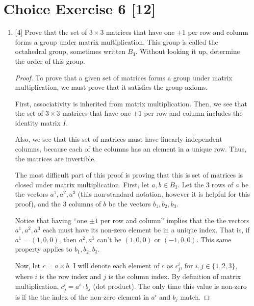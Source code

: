 \documentclass{article}
\begin{document}
\pagebreak

\section*{Choice Exercise 6 [12]}
\begin{enumerate}
    \item {
    [4]
        Prove that the set of \(3 \times 3\) matrices that have one \(\pm 1\) per row and column forms a group under matrix multiplication. This group is called the octahedral group, sometimes written \(B_3\). Without looking it up, determine the order of this group.

        \begin{proof}
            To prove that a given set of matrices forms a group under matrix multiplication,
            we must prove that it satisfies the group axioms. 

            First, associativity is inherited from matrix multiplication.
            Then, we see that the set of \(3 \times 3\) matrices that have one 
            \(\pm 1\) per row and column includes the identity matrix \(I\). 

            Also, we see that this set of matrices must have linearly independent 
            columns, because each of the columns has an element in a unique row. 
            Thus, the matrices are invertible. 

            The most difficult part of this proof is proving that this is set of 
            matrices is closed under matrix multiplication. First, let \(a, b \in B_3\).
            Let the 3 rows of \(a\) be the vectors \(a^1, a^2, a^3\) (this 
            non-standard notation, however it is helpful for this proof), and the 3
            columns of \(b\) be the vectors \(b_1, b_2, b_3\). 

            Notice that having ``one \(\pm 1\) per row and column'' implies that 
            the the vectors \(a^1, a^2, a^3\) each must have its non-zero element 
            be in a unique index. That is, if \(a^1 = (1,0,0)\), then \(a^2, a^3\) can't 
            be \((1,0,0)\) or \((-1,0,0)\). This same property applies to \(b_1, b_2, b_3\).

            Now, let \(c = a \times b\). I will denote each element of \(c\) as 
            \(c^i_j\), for \(i, j \in \{1, 2, 3\}\), where \(i\) is the row index 
            and \(j\) is the column index. By definition of matrix multiplication,
            \(c^i_j = a^i \cdot b_j\) (dot product). The only time this value is 
            non-zero is if the the index of the non-zero element in \(a^i\) and \(b_j\) match. 


\end{proof}}
\end{enumerate}
\end{document}
